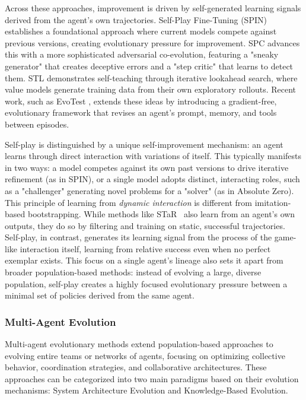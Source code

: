 \documentclass[10pt]{article} %
\begin{document}
Across these approaches, improvement is driven by self-generated learning signals derived from the agent’s own trajectories. Self-Play Fine-Tuning (SPIN) \citep{chen2024self} establishes a foundational approach where current models compete against previous versions, creating evolutionary pressure for improvement. SPC \citep{chen2025spc} advances this with a more sophisticated adversarial co-evolution, featuring a "sneaky generator" that creates deceptive errors and a "step critic" that learns to detect them. STL \citep{mendes2025language} demonstrates self-teaching through iterative lookahead search, where value models generate training data from their own exploratory rollouts. Recent work, such as EvoTest \citep{he2025evotest}, extends these ideas by introducing a gradient-free, evolutionary framework that revises an agent’s prompt, memory, and tools between episodes.

Self-play is distinguished by a unique self-improvement mechanism: an agent learns through direct interaction with variations of itself. This typically manifests in two ways: a model competes against its own past versions to drive iterative refinement (as in SPIN), or a single model adopts distinct, interacting roles, such as a "challenger" generating novel problems for a "solver" (as in Absolute Zero). This principle of learning from \textit{dynamic interaction} is different from imitation-based bootstrapping. While methods like STaR~\citep{zelikman2022star} also learn from an agent's own outputs, they do so by filtering and training on static, successful trajectories. Self-play, in contrast, generates its learning signal from the process of the game-like interaction itself, learning from relative success even when no perfect exemplar exists. This focus on a single agent's lineage also sets it apart from broader population-based methods: instead of evolving a large, diverse population, self-play creates a highly focused evolutionary pressure between a minimal set of policies derived from the same agent.



\subsubsection{Multi-Agent Evolution}

Multi-agent evolutionary methods extend population-based approaches to evolving entire teams or networks of agents, focusing on optimizing collective behavior, coordination strategies, and collaborative architectures. These approaches can be categorized into two main paradigms based on their evolution mechanisms: System Architecture Evolution and Knowledge-Based Evolution.
\end{document}
